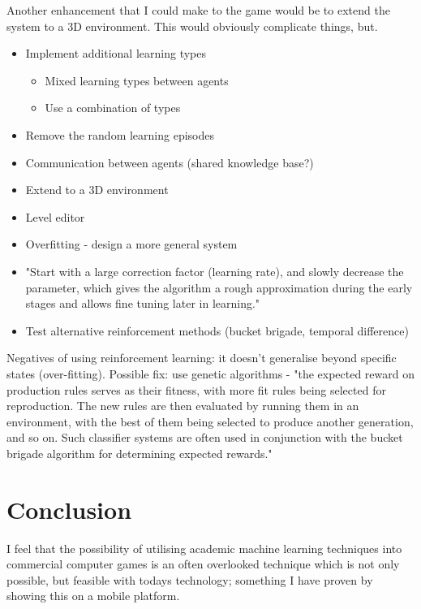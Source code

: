 \documentclass[a4paper,oneside]{report}
\begin{document}
Another enhancement that I could make to the game would be to extend the system to a 3D environment. This would obviously complicate things, but.

\begin{itemize}
	\item Implement additional learning types
	\begin{itemize}
		\item Mixed learning types between agents
    	\item Use a combination of types
    \end{itemize}
    \item Remove the random learning episodes
    \item Communication between agents (shared knowledge base?)
    \item Extend to a 3D environment
    \item Level editor
    \item Overfitting - design a more general system
    \item "Start with a large correction factor (learning rate), and slowly decrease the parameter, which gives the algorithm a rough approximation during the early stages and allows fine tuning later in learning."
    \item Test alternative reinforcement methods (bucket brigade, temporal difference) 
\end{itemize}

Negatives of using reinforcement learning: it doesn't generalise beyond specific states (over-fitting). Possible fix: use genetic algorithms - "the expected reward on production rules serves as their fitness, with more fit rules being selected for reproduction. The new rules are then evaluated by running them in an environment, with the best of them being selected to produce another generation, and so on. Such classifier systems are often used in conjunction with the bucket brigade algorithm for determining expected rewards."

\section{Conclusion}

I feel that the possibility of utilising academic machine learning techniques into commercial computer games is an often overlooked technique which is not only possible, but feasible with todays technology; something I have proven by showing this on a mobile platform. 
\end{document}

